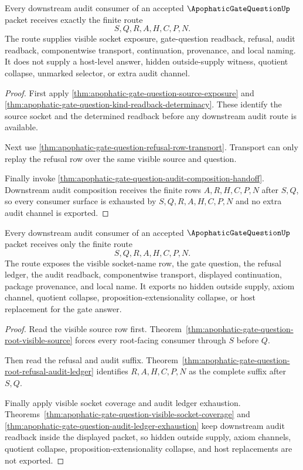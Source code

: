 \begin{theorem}
\label{thm:apophatic-gate-question-downstream-unblock-surface}
Every downstream audit consumer of an accepted $\ApophaticGateQuestionUp$ packet receives exactly the finite route
$$
S,Q,R,A,H,C,P,N.
$$
The route supplies visible socket exposure, gate-question readback, refusal, audit readback, componentwise transport, continuation, provenance, and local naming. It does not supply a host-level answer, hidden outside-supply witness, quotient collapse, unmarked selector, or extra audit channel.
\end{theorem}
\begin{proof}
First apply \autoref{thm:apophatic-gate-question-source-exposure} and \autoref{thm:apophatic-gate-question-kind-readback-determinacy}. These identify the source socket and the determined readback before any downstream audit route is available.

Next use \autoref{thm:apophatic-gate-question-refusal-row-transport}. Transport can only replay the refusal row over the same visible source and question.

Finally invoke \autoref{thm:apophatic-gate-question-audit-composition-handoff}. Downstream audit composition receives the finite rows $A,R,H,C,P,N$ after $S,Q$, so every consumer surface is exhausted by $S,Q,R,A,H,C,P,N$ and no extra audit channel is exported.
\end{proof}

\begin{theorem}
\label{thm:apophatic-gate-question-root-readback-route}
Every downstream audit consumer of an accepted $\ApophaticGateQuestionUp$ packet receives only the finite route
$$
S,Q,R,A,H,C,P,N.
$$
The route exposes the visible socket-name row, the gate question, the refusal ledger, the audit readback, componentwise transport, displayed continuation, package provenance, and local name. It exports no hidden outside supply, axiom channel, quotient collapse, proposition-extensionality collapse, or host replacement for the gate answer.
\end{theorem}
\begin{proof}
Read the visible source row first. Theorem~\ref{thm:apophatic-gate-question-root-visible-source} forces every root-facing consumer through $S$ before $Q$.

Then read the refusal and audit suffix. Theorem~\ref{thm:apophatic-gate-question-root-refusal-audit-ledger} identifies $R,A,H,C,P,N$ as the complete suffix after $S,Q$.

Finally apply visible socket coverage and audit ledger exhaustion. Theorems~\ref{thm:apophatic-gate-question-visible-socket-coverage} and \ref{thm:apophatic-gate-question-audit-ledger-exhaustion} keep downstream audit readback inside the displayed packet, so hidden outside supply, axiom channels, quotient collapse, proposition-extensionality collapse, and host replacements are not exported.
\end{proof}

